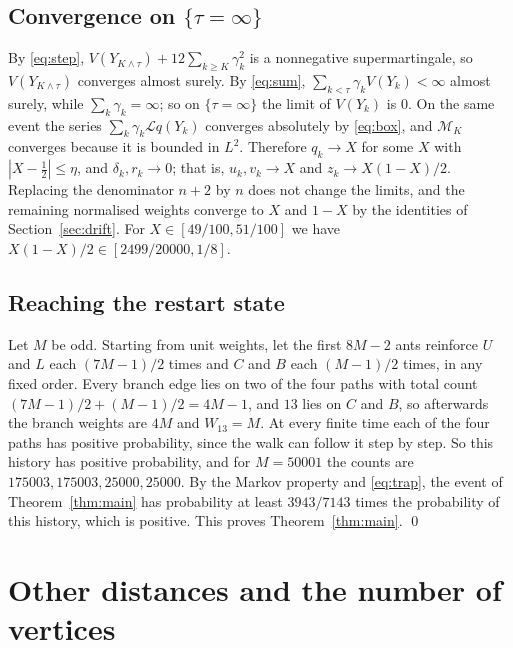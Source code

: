 \documentclass[11pt]{amsart}
\theoremstyle{remark}
\begin{document}
\subsection{\texorpdfstring{Convergence on $\{\tau=\infty\}$}{Convergence when the process stays trapped}}
By \eqref{eq:step}, $V(Y_{K\wedge\tau})+12\sum_{k\ge K}\gamma_k^2$ is a nonnegative supermartingale, so $V(Y_{K\wedge\tau})$ converges almost surely. By \eqref{eq:sum}, $\sum_{k<\tau}\gamma_kV(Y_k)<\infty$ almost surely, while $\sum_k\gamma_k=\infty$; so on $\{\tau=\infty\}$ the limit of $V(Y_k)$ is $0$. On the same event the series $\sum_k\gamma_k\mathcal Lq(Y_k)$ converges absolutely by \eqref{eq:box}, and $\mathcal M_K$ converges because it is bounded in $L^2$. Therefore $q_k\to X$ for some $X$ with $|X-\frac12|\le\eta$, and $\delta_k,r_k\to0$; that is, $u_k,v_k\to X$ and $z_k\to X(1-X)/2$. Replacing the denominator $n+2$ by $n$ does not change the limits, and the remaining normalised weights converge to $X$ and $1-X$ by the identities of Section~\ref{sec:drift}. For $X\in[49/100,51/100]$ we have $X(1-X)/2\in[2499/20000,1/8]$.

\subsection{Reaching the restart state}
Let $M$ be odd. Starting from unit weights, let the first $8M-2$ ants reinforce $U$ and $L$ each $(7M-1)/2$ times and $C$ and $B$ each $(M-1)/2$ times, in any fixed order. Every branch edge lies on two of the four paths with total count $(7M-1)/2+(M-1)/2=4M-1$, and $13$ lies on $C$ and $B$, so afterwards the branch weights are $4M$ and $W_{13}=M$. At every finite time each of the four paths has positive probability, since the walk can follow it step by step. So this history has positive probability, and for $M=50001$ the counts are $175003,175003,25000,25000$. By the Markov property and \eqref{eq:trap}, the event of Theorem~\ref{thm:main} has probability at least $3943/7143$ times the probability of this history, which is positive. This proves Theorem~\ref{thm:main}. \qed

\section{Other distances and the number of vertices}\label{sec:cor}
\end{document}
